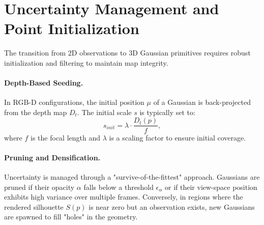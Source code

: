 \section{Uncertainty Management and Point Initialization}
\label{sec:point_init}

The transition from 2D observations to 3D Gaussian primitives requires robust initialization and filtering to maintain map integrity.

\paragraph{Depth-Based Seeding.} 
In RGB-D configurations, the initial position $\mu$ of a Gaussian is back-projected from the depth map $D_t$. The initial scale $s$ is typically set to:
\begin{equation}
    s_{init} = \lambda \cdot \frac{D_t(p)}{f},
\end{equation}
where $f$ is the focal length and $\lambda$ is a scaling factor to ensure initial coverage.

\paragraph{Pruning and Densification.} 
Uncertainty is managed through a "survive-of-the-fittest" approach. Gaussians are pruned if their opacity $\alpha$ falls below a threshold $\epsilon_{\alpha}$ or if their view-space position exhibits high variance over multiple frames. Conversely, in regions where the rendered silhouette $S(p)$ is near zero but an observation exists, new Gaussians are spawned to fill "holes" in the geometry.